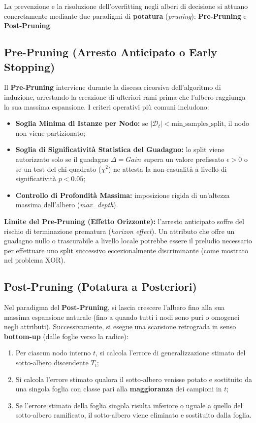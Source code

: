 La prevenzione e la risoluzione dell'overfitting negli alberi di decisione si attuano concretamente mediante due paradigmi di \textbf{potatura} (\textit{pruning}): \textbf{Pre-Pruning} e \textbf{Post-Pruning}.

\FloatBarrier
\subsection{Pre-Pruning (Arresto Anticipato o Early Stopping)}
\label{subsec:dm-pre-pruning}

Il \textbf{Pre-Pruning} interviene durante la discesa ricorsiva dell'algoritmo di induzione, arrestando la creazione di ulteriori rami prima che l'albero raggiunga la sua massima espansione.
I criteri operativi più comuni includono:
\begin{itemize}
    \item \textbf{Soglia Minima di Istanze per Nodo:} se $|\mathcal{D}_t| < \text{min\_samples\_split}$, il nodo non viene partizionato;
    \item \textbf{Soglia di Significativit\`a Statistica del Guadagno:} lo split viene autorizzato solo se il guadagno $\Delta = Gain$ supera un valore prefissato $\epsilon > 0$ o se un test del chi-quadrato ($\chi^2$) ne attesta la non-casualità a livello di significatività $p < 0.05$;
    \item \textbf{Controllo di Profondit\`a Massima:} imposizione rigida di un'altezza massima dell'albero (\textit{max\_depth}).
\end{itemize}
\textbf{Limite del Pre-Pruning (Effetto Orizzonte):} l'arresto anticipato soffre del rischio di terminazione prematura (\textit{horizon effect}). Un attributo che offre un guadagno nullo o trascurabile a livello locale potrebbe essere il preludio necessario per effettuare uno split successivo eccezionalmente discriminante (come mostrato nel problema XOR).

\FloatBarrier
\subsection{Post-Pruning (Potatura a Posteriori)}
\label{subsec:dm-post-pruning}

Nel paradigma del \textbf{Post-Pruning}, si lascia crescere l'albero fino alla sua massima espansione naturale (fino a quando tutti i nodi sono puri o omogenei negli attributi). Successivamente, si esegue una scansione retrograda in senso \textbf{bottom-up} (dalle foglie verso la radice):
\begin{enumerate}
    \item Per ciascun nodo interno $t$, si calcola l'errore di generalizzazione stimato del sotto-albero discendente $T_t$;
    \item Si calcola l'errore stimato qualora il sotto-albero venisse potato e sostituito da una singola foglia con classe pari alla \textbf{maggioranza} dei campioni in $t$;
    \item Se l'errore stimato della foglia singola risulta inferiore o uguale a quello del sotto-albero ramificato, il sotto-albero viene eliminato e sostituito dalla foglia.
\end{enumerate}

